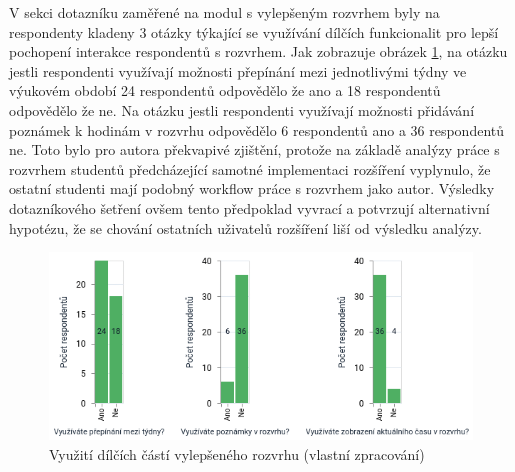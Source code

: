 V sekci dotazníku zaměřené na modul s vylepšeným rozvrhem byly na respondenty kladeny 3 otázky týkající se využívání dílčích funkcionalit pro lepší pochopení interakce respondentů s rozvrhem. Jak zobrazuje obrázek \ref{fig:timetable-feedback}, na otázku jestli respondenti využívají možnosti přepínání mezi jednotlivými týdny ve výukovém období 24 respondentů odpovědělo že ano a 18 respondentů odpovědělo že ne. Na otázku jestli respondenti využívají možnosti přidávání poznámek k hodinám v rozvrhu odpovědělo 6 respondentů ano a 36 respondentů ne. Toto bylo pro autora překvapivé zjištění, protože na základě analýzy práce s rozvrhem studentů předcházející samotné implementaci rozšíření vyplynulo, že ostatní studenti mají podobný workflow práce s rozvrhem jako autor. Výsledky dotazníkového šetření ovšem tento předpoklad vyvrací a potvrzují alternativní hypotézu, že se chování ostatních uživatelů rozšíření liší od výsledku analýzy.

\begin{figure}[htbp!]\centering
    \includegraphics[width=\textwidth]{img/timetable.png}
    \caption{Využití dílčích částí vylepšeného rozvrhu (vlastní zpracování)}
    \label{fig:timetable-feedback}
\end{figure}

